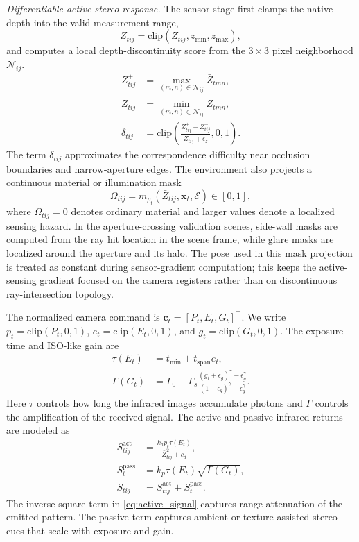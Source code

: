 \documentclass[letterpaper,journal]{IEEEtran}
\begin{document}
\textit{Differentiable active-stereo response.}
The sensor stage first clamps the native depth into the valid measurement
range,
\begin{equation}
    \bar Z_{tij}=\mathrm{clip}(Z_{tij},z_{\min},z_{\max}),
    \label{eq:depth_clip}
\end{equation}
and computes a local depth-discontinuity score from the $3\times3$ pixel
neighborhood $\mathcal{N}_{ij}$.
\begin{align}
    Z^{+}_{tij}
    &=\max_{(m,n)\in\mathcal{N}_{ij}}\bar Z_{tmn},\\
    Z^{-}_{tij}
    &=\min_{(m,n)\in\mathcal{N}_{ij}}\bar Z_{tmn},\\
    \delta_{tij}
    &=\mathrm{clip}\left(
    \frac{Z^{+}_{tij}-Z^{-}_{tij}}
    {\bar Z_{tij}+\epsilon_z},0,1\right).
    \label{eq:edge_score}
\end{align}
The term $\delta_{tij}$ approximates the correspondence difficulty near
occlusion boundaries and narrow-aperture edges. The environment also projects a
continuous material or illumination mask
\begin{equation}
    \Omega_{tij}=m_{\rho_t}(\bar Z_{tij},\mathbf{x}_t,\mathcal{E})\in[0,1],
    \label{eq:scene_mask}
\end{equation}
where $\Omega_{tij}=0$ denotes ordinary material and larger values denote a
localized sensing hazard. In the aperture-crossing validation scenes,
side-wall masks are computed from the ray hit location in the scene frame,
while glare masks are localized around the aperture and its halo. The pose
used in this mask projection is treated as constant during sensor-gradient
computation; this keeps the active-sensing gradient focused on the camera
registers rather than on discontinuous ray-intersection topology.

The normalized camera command is
$\mathbf{c}_t=[P_t,E_t,G_t]^\top$. We write
$p_t=\mathrm{clip}(P_t,0,1)$, $e_t=\mathrm{clip}(E_t,0,1)$, and
$g_t=\mathrm{clip}(G_t,0,1)$. The exposure time and ISO-like gain are
\begin{align}
    \tau(E_t) &=
    t_{\min}+t_{\mathrm{span}}e_t,
    \label{eq:exp_time}\\
    \Gamma(G_t) &=
    \Gamma_0+\Gamma_s
    \frac{(g_t+\epsilon_g)^\gamma-\epsilon_g^\gamma}
    {(1+\epsilon_g)^\gamma-\epsilon_g^\gamma}.
    \label{eq:iso_gain}
\end{align}
Here $\tau$ controls how long the infrared images accumulate photons and
$\Gamma$ controls the amplification of the received signal. The active and
passive infrared returns are modeled as
\begin{align}
    S^{\mathrm{act}}_{tij}
    &=\frac{k_a p_t\tau(E_t)}{\bar Z_{tij}^{2}+c_d},
    \label{eq:active_signal}\\
    S^{\mathrm{pass}}_{t}
    &=k_p\tau(E_t)\sqrt{\Gamma(G_t)},\\
    S_{tij}&=S^{\mathrm{act}}_{tij}+S^{\mathrm{pass}}_{t}.
    \label{eq:total_signal}
\end{align}
The inverse-square term in \eqref{eq:active_signal} captures range attenuation
of the emitted pattern. The passive term captures ambient or texture-assisted
stereo cues that scale with exposure and gain.
\end{document}
